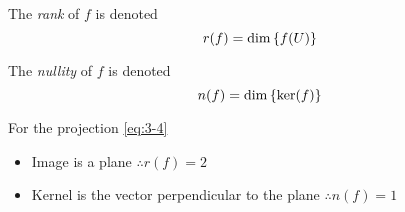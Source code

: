 \documentclass{article}
\numberwithin{equation}{section}
\begin{document}
\begin{defi}
    The \emph{rank} of $f$ is denoted
    \begin{equation}\label{eq:3-7}
        r(f) = \dim \left\{ f(U) \right\}
    \end{equation}

    The \emph{nullity} of $f$ is denoted
    \begin{equation}\label{eq:3-8}
        n(f) = \dim \left\{ \ker(f) \right\}
    \end{equation}
\end{defi}
\begin{eg}
    For the projection \eqref{eq:3-4}
    \begin{itemize}
        \item Image is a plane $\therefore r(f) = 2$
        \item Kernel is the vector perpendicular to the plane $\therefore n(f) = 1$
    \end{itemize}
\end{eg}
\end{document}
